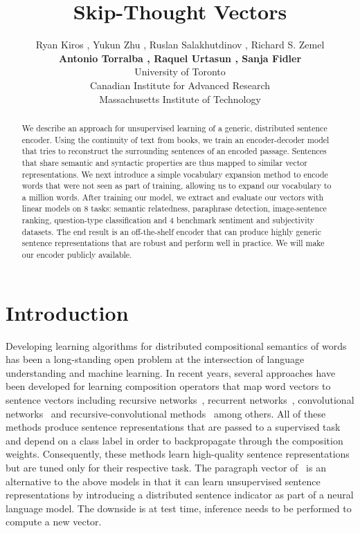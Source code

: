 \documentclass{article} \usepackage{nips15submit_e,times}
\title{Skip-Thought Vectors}
\author{
Ryan Kiros , Yukun Zhu , Ruslan Salakhutdinov , Richard S. Zemel  \\ {\bf Antonio Torralba ,  Raquel Urtasun , Sanja Fidler } \\
University of Toronto  \\
Canadian Institute for Advanced Research  \\
Massachusetts Institute of Technology  \\
}
\begin{document}
\maketitle

\begin{abstract}
We describe an approach for unsupervised learning of a generic, distributed sentence encoder. Using the continuity of text from books, we train an encoder-decoder model that tries to reconstruct the surrounding sentences of an encoded passage. Sentences that share semantic and syntactic properties are thus mapped to similar vector representations. We next introduce a simple vocabulary expansion method to encode words that were not seen as part of training, allowing us to expand our vocabulary to a million words. After training our model, we extract and evaluate our vectors with linear models on 8 tasks: semantic relatedness, paraphrase detection, image-sentence ranking, question-type classification and 4 benchmark sentiment and subjectivity datasets. The end result is an off-the-shelf encoder that can produce highly generic sentence representations that are robust and perform well in practice. We will make our encoder publicly available. 
\end{abstract}

\section{Introduction}

Developing learning algorithms for distributed compositional semantics of words has been a long-standing open problem at the intersection of language understanding and machine learning. In recent years, several approaches have been developed for learning composition operators that map word vectors to sentence vectors including recursive networks~\cite{socher2013recursive}, recurrent networks~\cite{hochreiter1997long}, convolutional networks~\cite{kalchbrenner2014convolutional, kim2014convolutional} and recursive-convolutional methods~\cite{cho2014properties, zhao2015self} among others. All of these methods produce sentence representations that are passed to a supervised task and depend on a class label in order to backpropagate through the composition weights. Consequently, these methods learn high-quality sentence representations but are tuned only for their respective task. The paragraph vector of~\cite{le2014distributed} is an alternative to the above models in that it can learn unsupervised sentence representations by introducing a distributed sentence indicator as part of a neural language model. The downside is at test time, inference needs to be performed to compute a new vector.
\end{document}
